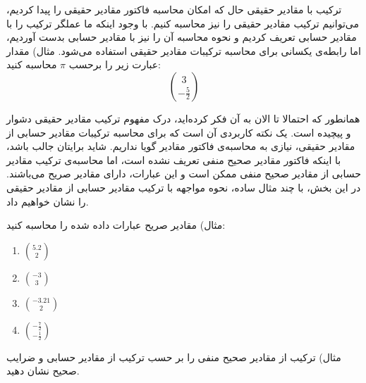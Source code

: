 \begin{EXTRA}{
    ترکیب با مقادیر حقیقی
}
\p
حال که امکان محاسبه فاکتور مقادیر حقیقی را پیدا کردیم، می‌توانیم ترکیب مقادیر
حقیقی را نیز محاسبه کنیم. با وجود اینکه ما عملگر ترکیب
را با مقادیر حسابی تعریف کردیم و نحوه محاسبه آن را نیز با مقادیر حسابی بدست آوردیم،
اما رابطه‌ی یکسانی برای محاسبه ترکیبات مقادیر حقیقی استفاده می‌شود.
\p
مثال)
مقدار عبارت زیر را برحسب $\pi$ محاسبه کنید:
$$3 \choose -\frac{5}{2}$$

\p
همانطور که احتمالا تا الان به آن فکر کرده‌اید، درک مفهوم ترکیب مقادیر حقیقی دشوار و پیچیده است.
\p
یک نکته کاربردی آن است که برای محاسبه ترکیبات مقادیر حسابی از مقادیر حقیقی، نیازی به
محاسبه‌ی فاکتور مقادیر گویا نداریم.
شاید برایتان جالب باشد، با اینکه فاکتور مقادیر صحیح منفی تعریف نشده است، اما محاسبه‌ی
ترکیب مقادیر حسابی از مقادیر صحیح منفی ممکن است و این عبارات، دارای مقادیر صریح می‌باشند.
در این بخش، با چند مثال ساده، نحوه مواجهه با ترکیب مقادیر حسابی از مقادیر حقیقی را نشان خواهیم داد.

\p
مثال)
مقادیر صریح عبارات داده شده را محاسبه کنید:

    \begin{enumerate}
        \item 
        $5.2 \choose 2$


        \item 
        $-3 \choose 3$


        \item 
        $-3.21 \choose 2$


        \item 
        $-\frac{7}{2} \choose -\frac{1}{2}$

    \end{enumerate}

\p
مثال)
ترکیب از مقادیر صحیح منفی را بر حسب ترکیب از مقادیر حسابی و ضرایب صحیح نشان دهید.
    

\end{EXTRA}
